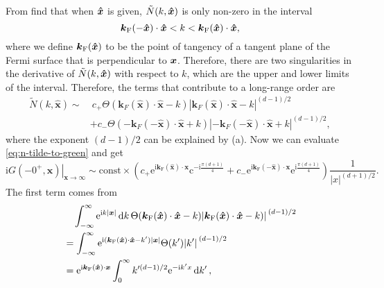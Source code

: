 \documentclass[hyperref, a4paper]{article}
\newcommand*{\ii}{\mathrm{i}}
\newcommand*{\ee}{\mathrm{e}}
\newcommand*{\const}{\mathrm{const}}
\begin{document}
From  find that when $\vu*{x}$ is given, $\tilde{N}(k, \vu*{x})$ is only non-zero 
in the interval 
\begin{equation}
    \vb*{k}_\text{F}(-\vu*{x}) \cdot \vu*{x} < k < \vb*{k}_\text{F}(\vu*{x}) \cdot \vu*{x},
    \label{eq:non-zero-n}
\end{equation}
where we define $\vb*{k}_\text{F}(\vu*{x})$ to be the point of tangency of a tangent plane of the Fermi
surface that is perpendicular to $\vb*{x}$.
Therefore, there are two singularities in the derivative of $\tilde{N}(k, \vu*{x})$ with respect to $k$,
which are the upper and lower limits of the interval. Therefore, the terms that contribute to a long-range 
order are 
\begin{equation}
    \begin{aligned}
        \tilde{N}(k, \hat{\boldsymbol{x}}) \sim &\  c_{+} \Theta\left(\boldsymbol{k}_{F}(\hat{\boldsymbol{x}}) \cdot \hat{\boldsymbol{x}}-k\right)\left|\boldsymbol{k}_{F}(\hat{\boldsymbol{x}}) \cdot \hat{\boldsymbol{x}}-k\right|^{(d-1) / 2} \\
        &+c_{-} \Theta\left(-\boldsymbol{k}_{F}(-\hat{\boldsymbol{x}}) \cdot \hat{\boldsymbol{x}}+k\right)\left|-\boldsymbol{k}_{F}(-\hat{\boldsymbol{x}}) \cdot \hat{\boldsymbol{x}}+k\right|^{(d-1) / 2},
        \end{aligned}
        \label{eq:n-tilde-singularity}
\end{equation}
where the exponent $(d-1)/2$ can be explained by (a). Now we can evaluate \eqref{eq:n-tilde-to-green} and get 
\begin{equation}
    \left.\mathrm{i} G\left(-0^{+}, \boldsymbol{x}\right)\right|_{\boldsymbol{x} \rightarrow \infty} \sim \const \times \left(c_{+} \mathrm{e}^{\mathrm{i} \boldsymbol{k}_\text{F}(\hat{\boldsymbol{x}}) \cdot \boldsymbol{x}} \mathrm{c}^{-\mathrm{i} \frac{\pi(d+1)}{4}}+c_{-} \mathrm{e}^{\mathrm{i} \boldsymbol{k}_\text{F}(-\hat{\boldsymbol{x}}) \cdot \boldsymbol{x}} \mathrm{e}^{\mathrm{i} \frac{\pi(d+1)}{4}}\right) \frac{1}{|x|^{(d+1) / 2}}.
    \label{eq:g-two-point-order}
\end{equation}
The first term comes from 
\[
    \begin{aligned}
        &\quad \int_{-\infty}^\infty \ee^{\ii k \abs*{\vb*{x}}} \dd{k} \Theta(\vb*{k}_\text{F}(\vu*{x}) \cdot \vu*{x} - k) \abs*{\vb*{k}_\text{F}(\vu*{x}) \cdot \vu*{x} - k)}^{(d-1)/2} \\
        &= \int_{-\infty}^\infty \ee^{\ii (\vb*{k}_\text{F}(\vu*{x}) \cdot \vu*{x} - k') \abs*{\vb*{x}}} \Theta(k') \abs*{k'}^{(d-1)/2} \\
        &= \ee^{ \ii \vb*{k}_\text{F}(\vu*{x}) \cdot \vb*{x}} \int_0^\infty k'^{(d-1)/2} \ee^{- \ii k' x} \dd{k'},
    \end{aligned}
\]
\end{document}
